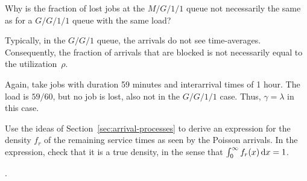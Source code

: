\begin{question}
  Why is the fraction of lost jobs at the $M/G/1/1$ queue not
  necessarily the same as for a $G/G/1/1$ queue with the same load?  
  \begin{solution}
 Typically, in the $G/G/1$ queue, the arrivals do not see  time-averages. Consequently, the fraction of arrivals that are blocked is not necessarily equal to the utilization~$\rho$.

  Again, take jobs with duration 59 minutes and interarrival times of
  1 hour. The load is $59/60$, but no job is lost, also not in the
  $G/G/1/1$ case. Thus, $\gamma=\lambda$ in this case.
  \end{solution}
\end{question}


\begin{question}[use=false]
  Use the ideas of Section~\ref{sec:arrival-processes} to derive an
  expression for the density $f_r$ of the remaining service times as
  seen by the Poisson arrivals.  In the expression, check that it is a
  true density, in the sense that $\int_0^\infty f_r(x) \,\text{d}x =1$.
  \begin{solution}
    \TBD.
  \end{solution}
\end{question}





